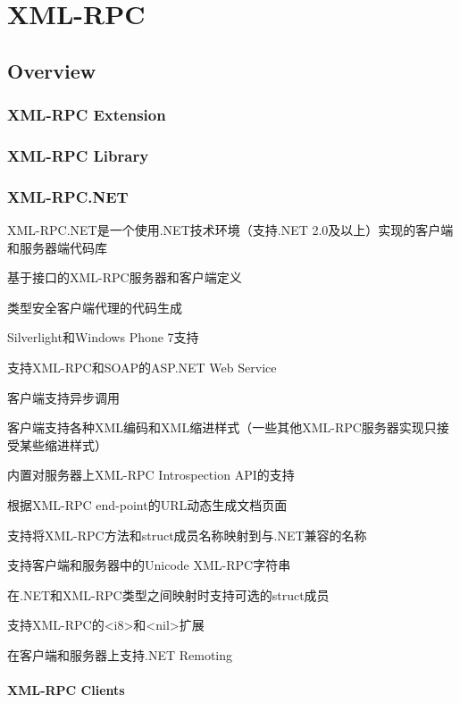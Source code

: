 \part{XML-RPC}


\chapter{Overview}

\section{XML-RPC Extension}


\section{XML-RPC Library}


\section{XML-RPC.NET}

XML-RPC.NET是一个使用.NET技术环境（支持.NET 2.0及以上）实现的客户端和服务器端代码库

\begin{compactitem}
\item 基于接口的XML-RPC服务器和客户端定义
\item 类型安全客户端代理的代码生成
\item Silverlight和Windows Phone 7支持
\item 支持XML-RPC和SOAP的ASP.NET Web Service
\item 客户端支持异步调用
\item 客户端支持各种XML编码和XML缩进样式（一些其他XML-RPC服务器实现只接受某些缩进样式）
\item 内置对服务器上XML-RPC Introspection API的支持
\item 根据XML-RPC end-point的URL动态生成文档页面
\item 支持将XML-RPC方法和struct成员名称映射到与.NET兼容的名称
\item 支持客户端和服务器中的Unicode XML-RPC字符串
\item 在.NET和XML-RPC类型之间映射时支持可选的struct成员
\item 支持XML-RPC的<i8>和<nil>扩展
\item 在客户端和服务器上支持.NET Remoting
\end{compactitem}

\subsection{XML-RPC Clients}

